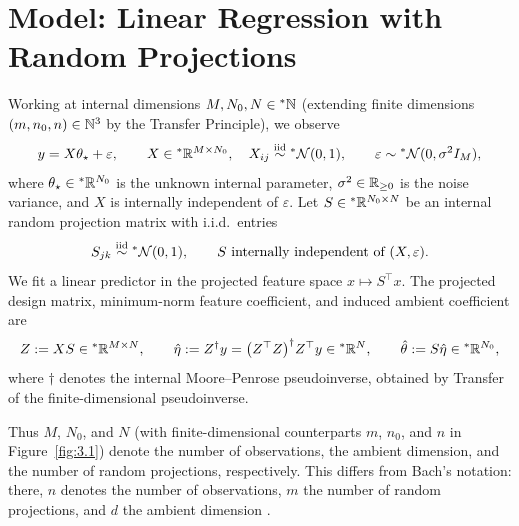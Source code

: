 \section{Model: Linear Regression with Random Projections}
\label{sec:3.2}

Working at internal dimensions $M, N_0, N \in {}^*\mathbb{N}$ (extending finite dimensions $(m, n_0, n) \in \mathbb{N}^3$ by the Transfer Principle), we observe
\begin{equation}\label{eq:3.1}
y = X\theta_\star + \varepsilon, \qquad X \in {}^*\mathbb{R}^{M \times N_0}, \quad X_{ij} \stackrel{\mathrm{iid}}{\sim} {}^*\mathcal{N}(0, 1), \qquad \varepsilon \sim {}^*\mathcal{N}(0, \sigma^2 I_M),
\end{equation}
where $\theta_\star \in {}^*\mathbb{R}^{N_0}$ is the unknown internal parameter, $\sigma^2 \in \mathbb{R}_{\ge 0}$ is the noise variance, and $X$ is internally independent of $\varepsilon$. Let $S \in {}^*\mathbb{R}^{N_0 \times N}$ be an internal random projection matrix with i.i.d.\ entries
\begin{equation}\label{eq:3.2}
S_{jk} \stackrel{\mathrm{iid}}{\sim} {}^*\mathcal{N}(0, 1), \qquad S \text{ internally independent of } (X, \varepsilon).
\end{equation}
We fit a linear predictor in the projected feature space $x \mapsto S^\top x$. The projected design matrix, minimum-norm feature coefficient, and induced ambient coefficient are
\begin{equation}\label{eq:3.3}
Z := XS \in {}^*\mathbb{R}^{M \times N}, \qquad \hat{\eta} := Z^\dagger y = \bigl(Z^\top Z\bigr)^\dagger Z^\top y \in {}^*\mathbb{R}^N, \qquad \hat{\theta} := S\hat{\eta} \in {}^*\mathbb{R}^{N_0},
\end{equation}
where $\dagger$ denotes the internal Moore--Penrose pseudoinverse, obtained by Transfer of the finite-dimensional pseudoinverse.

Thus $M$, $N_0$, and $N$ (with finite-dimensional counterparts $m$, $n_0$, and $n$ in Figure~\ref{fig:3.1}) denote the number of observations, the ambient dimension, and the number of random projections, respectively. This differs from Bach's notation: there, $n$ denotes the number of observations, $m$ the number of random projections, and $d$ the ambient dimension \cite{bach2024high}.

